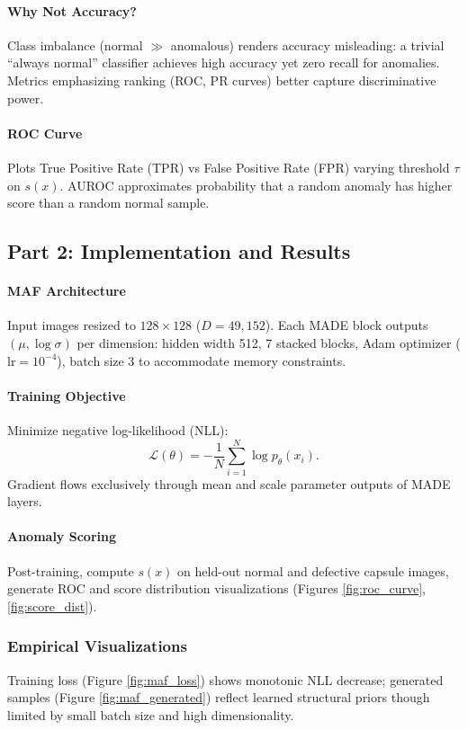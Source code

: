 \documentclass[11pt]{article}
\begin{document}
\paragraph{Why Not Accuracy?} Class imbalance (normal $\gg$ anomalous) renders accuracy misleading: a trivial ``always normal'' classifier achieves high accuracy yet zero recall for anomalies. Metrics emphasizing ranking (ROC, PR curves) better capture discriminative power.

\paragraph{ROC Curve} Plots True Positive Rate (TPR) vs False Positive Rate (FPR) varying threshold $\tau$ on $s(x)$. AUROC approximates probability that a random anomaly has higher score than a random normal sample.

\subsection{Part 2: Implementation and Results}
\paragraph{MAF Architecture} Input images resized to $128\times128$ ($D=49{,}152$). Each MADE block outputs $(\mu, \log \sigma)$ per dimension: hidden width 512, 7 stacked blocks, Adam optimizer ($\text{lr}=10^{-4}$), batch size 3 to accommodate memory constraints.

\paragraph{Training Objective} Minimize negative log-likelihood (NLL):
\begin{equation}
 \mathcal{L}(\theta) = -\frac{1}{N}\sum_{i=1}^{N} \log p_{\theta}(x_i).
\end{equation}
Gradient flows exclusively through mean and scale parameter outputs of MADE layers.

\paragraph{Anomaly Scoring} Post-training, compute $s(x)$ on held-out normal and defective capsule images, generate ROC and score distribution visualizations (Figures \ref{fig:roc_curve}, \ref{fig:score_dist}).

\subsubsection{Empirical Visualizations}
Training loss (Figure \ref{fig:maf_loss}) shows monotonic NLL decrease; generated samples (Figure \ref{fig:maf_generated}) reflect learned structural priors though limited by small batch size and high dimensionality.
\end{document}
